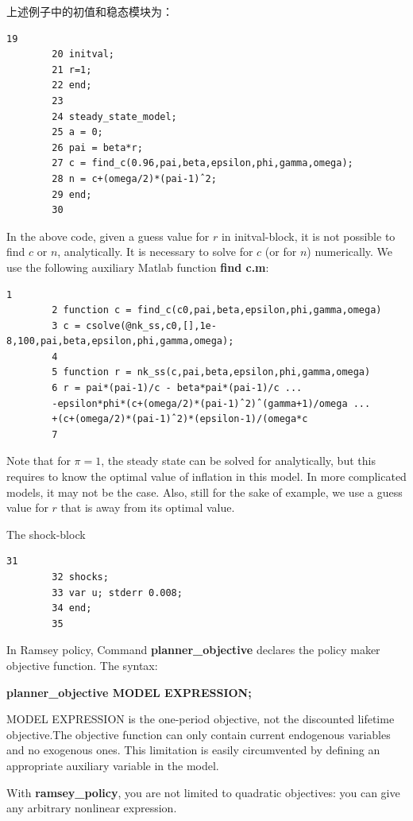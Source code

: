 \documentclass[cn,10pt,math=newtx,citestyle=gb7714-2015,bibstyle=gb7714-2015]{elegantbook}
\begin{document}
	上述例子中的初值和稳态模块为：
	
	\begin{lstlisting}[frame=shadowbox]
		19
		20 initval;
		21 r=1;
		22 end;
		23 
		24 steady_state_model;
		25 a = 0;
		26 pai = beta*r;
		27 c = find_c(0.96,pai,beta,epsilon,phi,gamma,omega);
		28 n = c+(omega/2)*(pai-1)ˆ2;
		29 end;
		30
	\end{lstlisting}
	
	In the above code, given a guess value for $r$ in initval-block, it is not possible to find $c$ or $n$, analytically. It is necessary to solve for $c$ (or for $n$) numerically. We use the following auxiliary Matlab function \textbf{find c.m}:
	
	\begin{lstlisting}[frame=shadowbox]
		1
		2 function c = find_c(c0,pai,beta,epsilon,phi,gamma,omega)
		3 c = csolve(@nk_ss,c0,[],1e-8,100,pai,beta,epsilon,phi,gamma,omega);
		4 
		5 function r = nk_ss(c,pai,beta,epsilon,phi,gamma,omega)
		6 r = pai*(pai-1)/c - beta*pai*(pai-1)/c ...
		-epsilon*phi*(c+(omega/2)*(pai-1)ˆ2)ˆ(gamma+1)/omega ...
		+(c+(omega/2)*(pai-1)ˆ2)*(epsilon-1)/(omega*c
		7
	\end{lstlisting}
	
	Note that for $\pi = 1$, the steady state can be solved for analytically, but this requires to know the optimal value of inflation in this model. In more complicated models, it
	may not be the case. Also, still for the sake of example, we use a guess value for $r$ that is away from its optimal value.
	
	The shock-block
	
	\begin{lstlisting}[frame=shadowbox]
		31 
		32 shocks;
		33 var u; stderr 0.008;
		34 end;
		35
	\end{lstlisting}
	
	In Ramsey policy, Command \textbf{planner\_objective} declares the policy maker objective function. The syntax:
	
	\textbf{planner\_objective MODEL EXPRESSION;}
	
	MODEL EXPRESSION is the one-period objective, not the discounted lifetime objective.The objective function can only contain current endogenous variables and no exogenous ones. This limitation is easily circumvented by defining an appropriate auxiliary variable in the model.
	
	With \textbf{ramsey\_policy}, you are not limited to quadratic objectives: you can give any arbitrary nonlinear expression.
	
\end{document}
